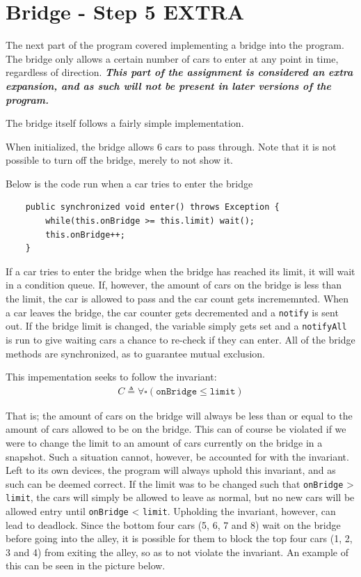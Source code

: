 \section{Bridge - Step 5 EXTRA}
The next part of the program covered implementing a bridge into the program. The bridge only allows a certain number of cars to enter at any point in time, regardless of direction. \textbf{\textit{This part of the assignment is considered an extra expansion, and as such will not be present in later versions of the program.}}

The bridge itself follows a fairly simple implementation. 

When initialized, the bridge allows 6 cars to pass through. Note that it is not possible to turn off the bridge, merely to not show it. 

Below is the code run when a car tries to enter the bridge
\begin{lstlisting}
    public synchronized void enter() throws Exception {
        while(this.onBridge >= this.limit) wait();
        this.onBridge++;
    }
\end{lstlisting}

If a car tries to enter the bridge when the bridge has reached its limit, it will wait in a condition queue. If, however, the amount of cars on the bridge is less than the limit, the car is allowed to pass and the car count gets incrememnted. When a car leaves the bridge, the car counter gets decremented and a \texttt{notify} is sent out. If the bridge limit is changed, the variable simply gets set and a \texttt{notifyAll} is run to give waiting cars a chance to re-check if they can enter. All of the bridge methods are synchronized, as to guarantee mutual exclusion.

This impementation seeks to follow the invariant:
\begin{gather*}
    C \triangleq \forall \square \left( \texttt{onBridge} \leq \texttt{limit} \right)
\end{gather*}

That is; the amount of cars on the bridge will always be less than or equal to the amount of cars allowed to be on the bridge. This can of course be violated if we were to change the limit to an amount of cars currently on the bridge in a snapshot. Such a situation cannot, however, be accounted for with the invariant. Left to its own devices, the program will always uphold this invariant, and as such can be deemed correct. If the limit was to be changed such that \texttt{onBridge} \textgreater \; \texttt{limit}, the cars will simply be allowed to leave as normal, but no new cars will be allowed entry until \texttt{onBridge} \textless \;  \texttt{limit}. Upholding the invariant, however, can lead to deadlock. Since the bottom four cars (5, 6, 7 and 8) wait on the bridge before going into the alley, it is possible for them to block the top four cars (1, 2, 3 and 4) from exiting the alley, so as to not violate the invariant. An example of this can be seen in the picture below.

